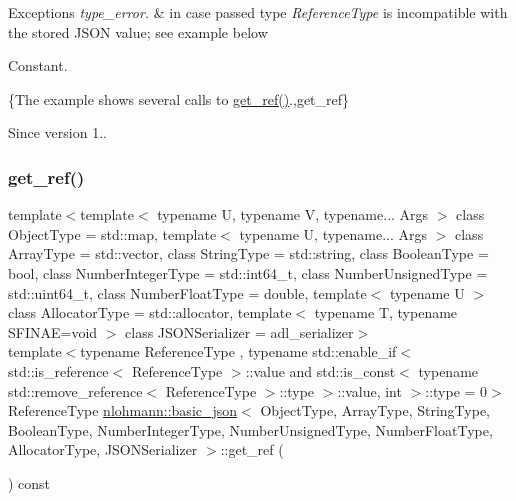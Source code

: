 \begin{DoxyExceptions}{Exceptions}
{\em type\+\_\+error.} & in case passed type {\itshape Reference\+Type} is incompatible with the stored J\+S\+ON value; see example below\\
\hline
\end{DoxyExceptions}
Constant.

\{The example shows several calls to {\ttfamily \mbox{\hyperlink{classnlohmann_1_1basic__json_afbd800010b67619463c0fce6e74f7878}{get\+\_\+ref()}}}.,get\+\_\+ref\}

\begin{DoxySince}{Since}
version 1.. 
\end{DoxySince}
\mbox{\label{classnlohmann_1_1basic__json_ac382f3d2bc6a5d52d936e4e40593f03b}} 
\subsubsection{\texorpdfstring{get\+\_\+ref()}{get\_ref()}\hspace{0.1cm}{\footnotesize\ttfamily [2/2]}}
{\footnotesize\ttfamily template$<$template$<$ typename U, typename V, typename... Args $>$ class Object\+Type = std\+::map, template$<$ typename U, typename... Args $>$ class Array\+Type = std\+::vector, class String\+Type  = std\+::string, class Boolean\+Type  = bool, class Number\+Integer\+Type  = std\+::int64\+\_\+t, class Number\+Unsigned\+Type  = std\+::uint64\+\_\+t, class Number\+Float\+Type  = double, template$<$ typename U $>$ class Allocator\+Type = std\+::allocator, template$<$ typename T, typename S\+F\+I\+N\+A\+E=void $>$ class J\+S\+O\+N\+Serializer = adl\+\_\+serializer$>$ \\
template$<$typename Reference\+Type , typename std\+::enable\+\_\+if$<$ std\+::is\+\_\+reference$<$ Reference\+Type $>$\+::value and std\+::is\+\_\+const$<$ typename std\+::remove\+\_\+reference$<$ Reference\+Type $>$\+::type $>$\+::value, int $>$\+::type  = 0$>$ \\
Reference\+Type \mbox{\hyperlink{classnlohmann_1_1basic__json}{nlohmann\+::basic\+\_\+json}}$<$ Object\+Type, Array\+Type, String\+Type, Boolean\+Type, Number\+Integer\+Type, Number\+Unsigned\+Type, Number\+Float\+Type, Allocator\+Type, J\+S\+O\+N\+Serializer $>$\+::get\+\_\+ref (\begin{DoxyParamCaption}{ }\end{DoxyParamCaption}) const\hspace{0.3cm}{\ttfamily [inline]}}



